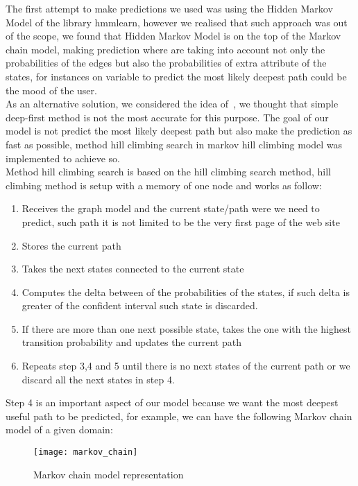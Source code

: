 The first attempt to make predictions we used was using the Hidden Markov Model of the library hmmlearn, however we realised that such approach was out of the scope, we found that Hidden Markov Model is on the top of the Markov chain model, making prediction where are taking into account not only the probabilities of the edges but also the probabilities of extra attribute of the states, for instances on variable to predict the most likely deepest path could be the mood of the user.
\\[2ex]
As an alternative solution, we considered the idea of~\cite{article:markovmodel}, we thought that simple deep-first method is not the most accurate for this purpose. The goal of our model is not predict the most likely deepest path but also make the prediction as fast as possible, method hill climbing search in markov hill climbing model was implemented to achieve so.
\\[2ex]
Method hill climbing search is based  on the hill climbing search method, hill climbing method is setup with a memory of one node and works as follow:

\begin{enumerate}
  \item Receives the graph model and the current state/path were we need to predict, such path it is not limited to be the very first page of the web site
  \item Stores the current path
  \item Takes the next states connected to the current state
  \item Computes the delta between of the probabilities of the states, if such delta is greater of the confident interval such state is discarded.
  \item If there are more than one next possible state, takes the one with the highest transition probability and updates the current path
  \item Repeats step 3,4 and 5 until there is no next states of the current path or we discard all the next states in step 4.
\end{enumerate}

Step 4 is an important aspect of our model because we want the most deepest useful path to be predicted, for example, we can have the following Markov chain model of a given domain:

\begin{figure}[!htp]
    \centering
    \texttt{[image: markov\_chain]}
    \caption{Markov chain model representation}\label{fig:markov_chain}
\end{figure}

